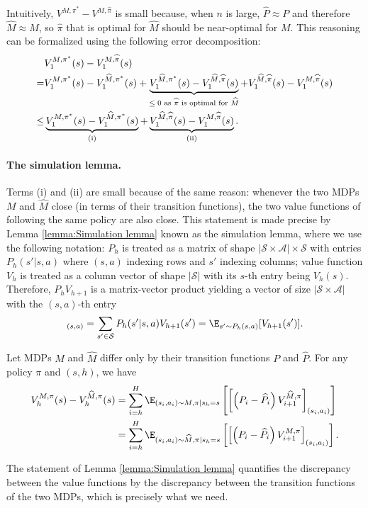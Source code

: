 Intuitively, $V^{M,\pi^*} - V^{M,\widehat{\pi}}$ is small because, when $n$ is large, $\widehat{P}\approx P$ and therefore $\widehat{M}\approx M$, so $\widehat{\pi}$ that is optimal for $\widehat{M}$ should be near-optimal for $M$.
This reasoning can be formalized using the following error decomposition:
\begin{align*}
&V^{M,\pi^*}_1(s) - V^{M,\widehat{\pi}}_1(s) \\
=&V^{M,\pi^*}_1(s) -V^{\widehat{M},\pi^*}_1(s) + \underbrace{V^{\widehat{M},\pi^*}_1(s)-V^{\widehat{M},\widehat{\pi}}_1(s)}_{\text{$\leq0$ as $\widehat{\pi}$ is optimal for $\widehat{M}$}}+ V^{\widehat{M},\widehat{\pi}}_1(s) - V^{M,\widehat{\pi}}_1(s)\\
\leq& \underbrace{V^{M,\pi^*}_1(s) -V^{\widehat{M},\pi^*}_1(s)}_{\rm (i)} + \underbrace{V^{\widehat{M},\widehat{\pi}}_1(s) - V^{M,\widehat{\pi}}_1(s)}_{\rm (ii)}
.
\end{align*}
\paragraph{The simulation lemma.}
Terms (i) and (ii) are small because of the same reason:
whenever the two MDPs $M$ and $\widehat{M}$ close (in terms of their transition functions), the two value functions of following the same policy are also close.
This statement is made precise by Lemma \ref{lemma:Simulation lemma} known as the simulation lemma, where we use the following notation:
$P_h$ is treated as a matrix of shape $|\mathcal{S}\times\mathcal{A}|\times\mathcal{S}$ with entries $P_h(s'|s,a)$ where $(s,a)$ indexing rows and $s'$ indexing columns; 
value function $V_h$ is treated as a column vector of shape $|\mathcal{S}|$ with its $s$-th entry being $V_h(s)$.
Therefore, $P_hV_{h+1}$ is a matrix-vector product yielding a vector of size $|\mathcal{S}\times\mathcal{A}|$ with the $(s,a)$-th entry
\begin{align*}
    [P_hV_{h+1}]_{(s,a)} = \sum_{s'\in\mathcal{S}}P_h(s'|s,a)V_{h+1}(s') = \E_{s'\sim P_h(s,a)}[V_{h+1}(s')]
    .
\end{align*}
\begin{lemma}
\label{lemma:Simulation lemma}
Let MDPs $M$ and $\widehat{M}$ differ only by their transition functions $P$ and $\widehat{P}$. For any policy $\pi$ and $(s, h)$, we have
\begin{align*}
V_h^{M, \pi}(s)-V_h^{\widehat{M}, \pi}(s) & =\sum_{i=h}^H \E_{\left(s_i, a_i\right) \sim M, \pi | s_h=s}\left[\left[\left(P_i-\widehat{P}_i\right) V_{i+1}^{\widehat{M}, \pi}\right]_{(s_i,a_i)}\right] \\
& =\sum_{i=h}^H \E_{\left(s_i, a_i\right) \sim \widehat{M}, \pi | s_h=s}\left[\left[\left(P_i-\widehat{P}_i\right) V_{i+1}^{M, \pi}\right]_{(s_i,a_i)}\right]
.
\end{align*}
\end{lemma}
The statement of Lemma \ref{lemma:Simulation lemma} quantifies the discrepancy between the value functions by the discrepancy between the transition functions of the two MDPs, which is precisely what we need.

